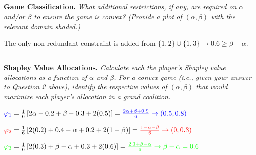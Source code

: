 \documentclass[12pt]{amsart}
\begin{document}
\subsection{}
\textbf{Game Classification.} 
\textit{What additional restrictions, if any, are required on $\alpha$ and/or $\beta$ to ensure the game is convex? (Provide a plot of $(\alpha,\beta)$ with the relevant domain shaded.)}

The only non-redundant constraint is added from $\{1,2\}\cup\{1,3\} \rightarrow 0.6\geq\beta-\alpha$.

\begin{center}
\end{center}

\subsection{}
\textbf{Shapley Value Allocations.} 
\textit{Calculate each the player’s Shapley value allocations as a function of $\alpha$ and $\beta$. For a convex game (i.e., given your answer to Question 2 above), identify the respective values of $(\alpha,\beta)$ that would maximize each player’s allocation in a grand coalition.}

$\textcolor{blue}{\varphi_1} = \frac{1}{6}\left[ 2\alpha + 0.2 + \beta-0.3 + 2(0.5) \right] = \textcolor{blue}{ \frac{2\alpha+\beta+0.9}{6} \rightarrow (0.5,0.8) } $

$\textcolor{red}{\varphi_2} = \frac{1}{6}\left[ 2(0.2) + 0.4-\alpha + 0.2 + 2(1-\beta) \right] = \textcolor{red}{ \frac{1-\alpha-\beta}{6} \rightarrow (0,0.3) } $

$\textcolor{green}{\varphi_3} = \frac{1}{6}\left[ 2(0.3) + \beta-\alpha + 0.3 + 2(0.6) \right] = \textcolor{green}{ \frac{2.1+\beta-\alpha}{6} \rightarrow \beta-\alpha = 0.6 } $
\end{document}
